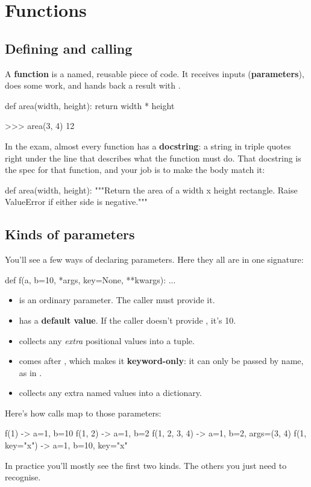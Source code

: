 \documentclass[10pt,a4paper]{article}
\begin{document}
\section{Functions}
\subsection{Defining and calling}
A \textbf{function} is a named, reusable piece of code. It receives inputs (\textbf{parameters}), does some work, and hands back a result with .
\begin{pycode}
def area(width, height):
    return width * height
\end{pycode}
\begin{txtcode}
>>> area(3, 4)
12
\end{txtcode}
In the exam, almost every function has a \textbf{docstring}: a string in triple quotes right under the  line that describes what the function must do. That docstring is the spec for that function, and your job is to make the body match it:
\begin{pycode}
def area(width, height):
    """Return the area of a width x height rectangle. Raise ValueError if either side is negative."""
\end{pycode}
\subsection{Kinds of parameters}
You’ll see a few ways of declaring parameters. Here they all are in one signature:
\begin{pycode}
def f(a, b=10, *args, key=None, **kwargs):
    ...
\end{pycode}
\begin{itemize}
\item {} is an ordinary parameter. The caller must provide it.
\item {} has a \textbf{default value}. If the caller doesn’t provide , it’s 10.
\item {} collects any \emph{extra} positional values into a tuple.
\item {} comes after , which makes it \textbf{keyword-only}: it can only be passed by name, as in .
\item {} collects any extra named values into a dictionary.
\end{itemize}
Here’s how calls map to those parameters:
\begin{txtcode}
f(1)            -> a=1, b=10
f(1, 2)         -> a=1, b=2
f(1, 2, 3, 4)   -> a=1, b=2, args=(3, 4)
f(1, key="x")   -> a=1, b=10, key="x"
\end{txtcode}
In practice you’ll mostly see the first two kinds. The others you just need to recognise.
\end{document}

